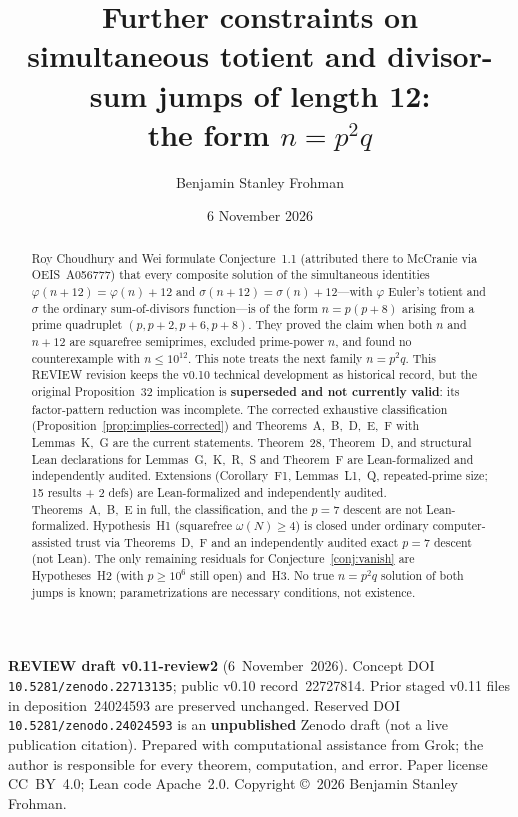 \documentclass[11pt,reqno]{amsart}
\title[Totient and divisor-sum jumps of length 12]{Further constraints on simultaneous totient and divisor-sum jumps of length 12:\\ the form \(n=p^2q\)}
\author{Benjamin Stanley Frohman}
\date{6 November 2026}
\newcommand{\ph}{\varphi}
\newcommand{\sig}{\sigma}
\theoremstyle{definition}
\begin{document}
\begin{abstract}
Roy Choudhury and Wei formulate Conjecture~1.1 (attributed there to McCranie via OEIS~A056777) that every composite solution of the simultaneous identities
\(\ph(n+12)=\ph(n)+12\) and \(\sig(n+12)=\sig(n)+12\)---with \(\ph\) Euler's totient and \(\sig\) the ordinary sum-of-divisors function---is of the form \(n=p(p+8)\) arising from a prime quadruplet
\((p,p+2,p+6,p+8)\). They proved the claim when both \(n\) and \(n+12\) are squarefree semiprimes, excluded prime-power
\(n\), and found no counterexample with \(n\le 10^{12}\). This note treats the next family \(n=p^2q\).
This REVIEW revision keeps the v0.10 technical development as historical record, but the original Proposition~32 implication is \textbf{superseded and not currently valid}: its factor-pattern reduction was incomplete. The corrected exhaustive classification (Proposition~\ref{prop:implies-corrected}) and Theorems~A,~B,~D,~E,~F with Lemmas~K,~G are the current statements. Theorem~28, Theorem~D, and structural Lean declarations for Lemmas~G,~K,~R,~S and Theorem~F are Lean-formalized and independently audited. Extensions (Corollary~F1, Lemmas~L1,~Q, repeated-prime size; 15 results + 2 defs) are Lean-formalized and independently audited. Theorems~A,~B,~E in full, the classification, and the \(p=7\) descent are not Lean-formalized. Hypothesis~H1 (squarefree \(\omega(N)\ge 4\)) is closed under ordinary computer-assisted trust via Theorems~D,~F and an independently audited exact \(p=7\) descent (not Lean). The only remaining residuals for Conjecture~\ref{conj:vanish} are Hypotheses~H2 (with \(p\ge 10^6\) still open) and~H3. No true \(n=p^2q\) solution of both jumps is known; parametrizations are necessary conditions, not existence.
\end{abstract}

\maketitle

\vspace{-0.7em}
{\small\noindent
\textbf{REVIEW draft v0.11-review2} (6~November~2026).
Concept DOI \texttt{10.5281/zenodo.22713135}; public v0.10 record~22727814.
Prior staged v0.11 files in deposition~24024593 are preserved unchanged.
Reserved DOI \texttt{10.5281/zenodo.24024593} is an \textbf{unpublished} Zenodo draft (not a live publication citation).
Prepared with computational assistance from Grok; the author is responsible for every theorem, computation, and error.
Paper license CC~BY~4.0; Lean code Apache~2.0.
Copyright \copyright\ 2026 Benjamin Stanley Frohman.}
\end{document}
